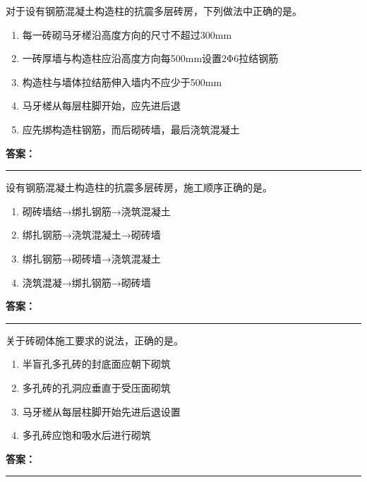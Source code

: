 \documentclass[UTF8,fontset=fandol,11pt]{ctexart}
\newcommand{\answerline}{\textcolor{answerred}{\rule{2.4cm}{0.7pt}}}
\begin{document}
\begin{quizbox}[title={第 22 题}]
对于设有钢筋混凝土构造柱的抗震多层砖房，下列做法中正确的是。\\
\begin{enumerate}[label=\Alph*.]
\item 每一砖砌马牙槎沿高度方向的尺寸不超过300mm
\item 一砖厚墙与构造柱应沿高度方向每500mm设置2Φ6拉结钢筋
\item 构造柱与墙体拉结筋伸入墙内不应少于500mm
\item 马牙槎从每层柱脚开始，应先进后退
\item 应先绑构造柱钢筋，而后砌砖墙，最后浇筑混凝土
\end{enumerate}
\textbf{\textcolor{answerred}{答案：}} \answerline
\end{quizbox}

\vspace{0.2em}

\begin{quizbox}[title={第 23 题}]
设有钢筋混凝土构造柱的抗震多层砖房，施工顺序正确的是。\\
\begin{enumerate}[label=\Alph*.]
\item 砌砖墙结→绑扎钢筋→浇筑混凝土
\item 绑扎钢筋→浇筑混凝土→砌砖墙
\item 绑扎钢筋→砌砖墙→浇筑混凝土
\item 浇筑混凝→绑扎钢筋→砌砖墙
\end{enumerate}
\textbf{\textcolor{answerred}{答案：}} \answerline
\end{quizbox}

\vspace{0.2em}

\begin{quizbox}[title={第 24 题}]
关于砖砌体施工要求的说法，正确的是。\\
\begin{enumerate}[label=\Alph*.]
\item 半盲孔多孔砖的封底面应朝下砌筑
\item 多孔砖的孔洞应垂直于受压面砌筑
\item 马牙槎从每层柱脚开始先进后退设置
\item 多孔砖应饱和吸水后进行砌筑
\end{enumerate}
\textbf{\textcolor{answerred}{答案：}} \answerline
\end{quizbox}

\vspace{0.2em}
\end{document}

